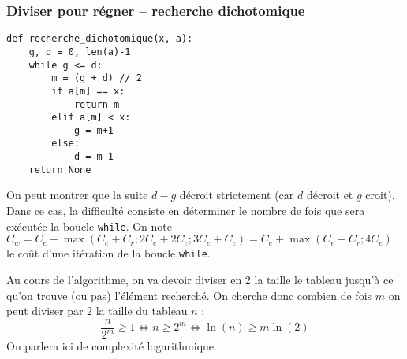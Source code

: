 \subsubsection{Diviser pour régner -- recherche dichotomique}
\begin{exemple}
\begin{lstlisting}
def recherche_dichotomique(x, a):
    g, d = 0, len(a)-1
    while g <= d:
        m = (g + d) // 2
        if a[m] == x:
            return m
        elif a[m] < x:
            g = m+1
        else:
            d = m-1
    return None
\end{lstlisting}
On peut montrer que la suite $d-g$ décroit strictement (car $d$ décroit et $g$ croit).
Dans ce cas, la difficulté consiste en déterminer le nombre de fois que sera exécutée la boucle \texttt{while}. On note $C_w = C_e + \max\left(C_e + C_r ; 2 C_e + 2 C_e; 3 C_e + C_e \right) = C_e + \max\left(C_e + C_r ; 4 C_e  \right)$ le coût d'une itération de la boucle \texttt{while}.

Au cours de l'algorithme, on va devoir diviser en 2 la taille le tableau jusqu'à ce qu'on trouve (ou pas) l'élément recherché. On cherche donc combien de fois $m$ on peut diviser par 2 la taille du tableau $n$ :
$$
\dfrac{n}{2^m} \geq 1 \Longleftrightarrow n \geq 2^m \Longleftrightarrow \ln(n)\geq m \ln(2) $$
On parlera ici de complexité logarithmique.


%
%




\end{exemple}




